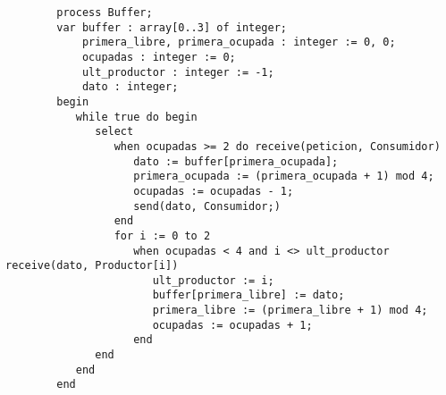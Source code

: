 \begin{ejercicio}
    \begin{verbatim}
        process Buffer;
        var buffer : array[0..3] of integer;
            primera_libre, primera_ocupada : integer := 0, 0;
            ocupadas : integer := 0;
            ult_productor : integer := -1;
            dato : integer;
        begin
           while true do begin
              select 
                 when ocupadas >= 2 do receive(peticion, Consumidor)
                    dato := buffer[primera_ocupada];
                    primera_ocupada := (primera_ocupada + 1) mod 4;
                    ocupadas := ocupadas - 1;
                    send(dato, Consumidor;)
                 end
                 for i := 0 to 2
                    when ocupadas < 4 and i <> ult_productor receive(dato, Productor[i])
                       ult_productor := i;
                       buffer[primera_libre] := dato;
                       primera_libre := (primera_libre + 1) mod 4;
                       ocupadas := ocupadas + 1;
                    end
              end
           end
        end
    \end{verbatim}
\end{ejercicio}

